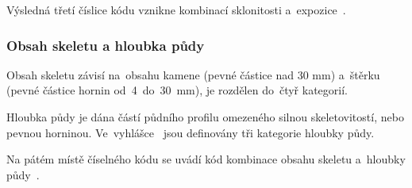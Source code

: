 Výsledná třetí číslice kódu  vznikne kombinací sklonitosti
a~expozice~\citep{vyhlaska_327}.

\subsubsection{Obsah skeletu a hloubka půdy}
\label{hloubka_pudy_obsah_skeletu}

Obsah skeletu závisí na~obsahu kamene (pevné částice nad 30 mm)
a~štěrku (pevné částice hornin od~4~do~30~mm), je rozdělen do~čtyř
kategorií.

Hloubka půdy je dána částí půdního profilu omezeného silnou
skeletovitostí, nebo pevnou horninou. Ve~vyhlášce~\citep{vyhlaska_327}
jsou definovány tři kategorie hloubky půdy.

Na pátém místě číselného kódu  se uvádí kód kombinace obsahu
skeletu a~hloubky půdy~\citep{vyhlaska_327}.
